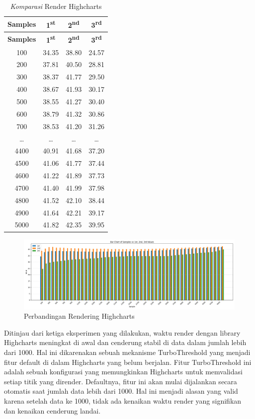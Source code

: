 \begin{longtable}{|c|c|c|c|}
	\caption{\textit{Komparasi} Render Highcharts} \\
	\hline
	\textbf{Samples} & \textbf{1\textsuperscript{st}} & \textbf{2\textsuperscript{nd}} & \textbf{3\textsuperscript{rd}} \\
	\hline
	\endfirsthead
	\hline
	\textbf{Samples} & \textbf{1\textsuperscript{st}} & \textbf{2\textsuperscript{nd}} & \textbf{3\textsuperscript{rd}} \\
	\hline
	\endhead
100  & 34.35 & 38.80 & 24.57 \\
200  & 37.81 & 40.50 & 28.81 \\
300  & 38.37 & 41.77 & 29.50 \\
400  & 38.67 & 41.93 & 30.17 \\
500  & 38.55 & 41.27 & 30.40 \\
600  & 38.79 & 41.32 & 30.86 \\
700  & 38.53 & 41.20 & 31.26 \\
\ldots & \ldots & \ldots & \ldots \\
4400 & 40.91 & 41.68 & 37.20 \\
4500 & 41.06 & 41.77 & 37.44 \\
4600 & 41.22 & 41.89 & 37.73 \\
4700 & 41.40 & 41.99 & 37.98 \\
4800 & 41.52 & 42.10 & 38.44 \\
4900 & 41.64 & 42.21 & 39.17 \\
5000 & 41.82 & 42.35 & 39.95 \\
	\hline
\end{longtable}
 	\begin{figure}[H]
	\centering
	\includegraphics[width=0.8\linewidth]{gambar/Pembahasan/FIX_Render/hc.png}
	\caption{Perbandingan Rendering Highcharts}
	\label{Perbandingan Rendering Highcharts}
\end{figure}
Ditinjau dari ketiga eksperimen yang dilakukan, waktu render dengan library Highcharts meningkat di awal dan cenderung stabil di data dalam jumlah lebih dari 1000. Hal ini dikarenakan sebuah mekanisme TurboThreshold yang menjadi fitur default di dalam Highcharts yang belum berjalan. Fitur TurboThreshold ini adalah sebuah konfigurasi yang memungkinkan Highcharts untuk memvalidasi setiap titik yang dirender. Defaultnya, fitur ini akan mulai dijalankan secara otomatis saat jumlah data lebih dari 1000. Hal ini menjadi alasan yang valid karena setelah data ke 1000, tidak ada kenaikan waktu render yang signifikan dan kenaikan cenderung landai. 

